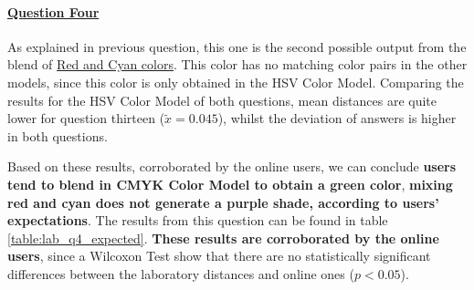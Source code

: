 \paragraph{\ul{Question Four}}
%
As explained in previous question, this one is the second possible output from the blend of \ul{Red and Cyan colors}. This color has no matching color pairs in the other models,
since this color is only obtained in the HSV Color Model. Comparing the results for the HSV Color Model of both questions, mean distances are quite lower for question thirteen
($\tilde{x} = 0.045$), whilst the deviation of answers is higher in both questions. \par
%
Based on these results, corroborated by the online users, we can conclude \textbf{users tend to blend in CMYK Color Model to obtain a green color}, \textbf{mixing red and cyan
does not generate a purple shade, according to users' expectations}. The results from this question can be found in table \ref{table:lab_q4_expected}. \textbf{These results are
corroborated by the online users}, since a Wilcoxon Test show that there are no statistically significant differences between the laboratory distances and online ones ($p < 0.05$).
%

